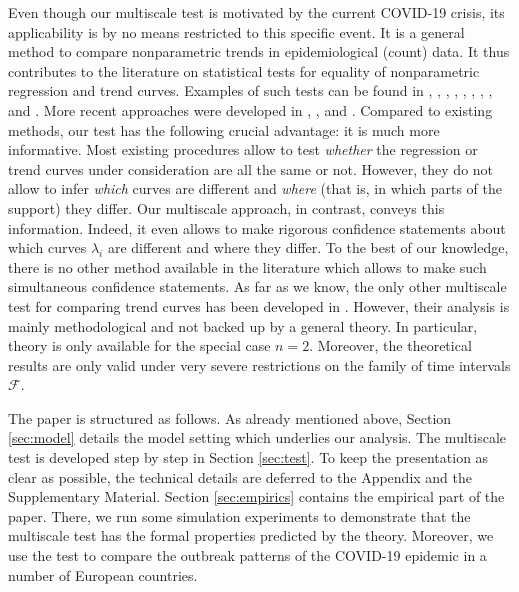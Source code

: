 \documentclass[a4paper,12pt]{article}
\numberwithin{equation}{section}
\begin{document}
Even though our multiscale test is motivated by the current COVID-19 crisis, its applicability is by no means restricted to this specific event. It is a general method to compare nonparametric trends in epidemiological (count) data. It thus contributes to the literature on statistical tests for equality of nonparametric regression and trend curves. Examples of such tests can be found in \cite{HaerdleMarron1990}, \cite{Hall1990}, \cite{King1991}, \cite{Delgado1993}, \cite{Kulasekera1995}, \cite{YoungBowman1995}, \cite{MunkDette1998}, \cite{Lavergne2001}, \cite{NeumeyerDette2003} and \cite{Pardo-Fernandez2007}. More recent approaches were developed in \cite{DegrasWu2012}, \cite{Zhang2012}, \cite{Hidalgo2014} and \cite{ChenWu2018}. Compared to existing methods, our test has the following crucial advantage: it is much more informative. Most existing procedures allow to test \textit{whether} the regression or trend curves under consideration are all the same or not. However, they do not allow to infer \textit{which} curves are different and \textit{where} (that is, in which parts of the support) they differ. Our multiscale approach, in contrast, conveys this information. Indeed, it even allows to make rigorous confidence statements about which curves $\lambda_i$ are different and where they differ. To the best of our knowledge, there is no other method available in the literature which allows to make such simultaneous confidence statements. As far as we know, the only other multiscale test for comparing trend curves has been developed in \cite{Park2009}. However, their analysis is mainly methodological and not backed up by a general theory. In particular, theory is only available for the special case $n = 2$. Moreover, the theoretical results are only valid under very severe restrictions on the family of time intervals $\mathcal{F}$. 

The paper is structured as follows. As already mentioned above, Section \ref{sec:model} details the model setting which underlies our analysis. The multiscale test is developed step by step in Section \ref{sec:test}. To keep the presentation as clear as possible, the technical details are deferred to the Appendix and the Supplementary Material. Section \ref{sec:empirics} contains the empirical part of the paper. There, we run some simulation experiments to demonstrate that the multiscale test has the formal properties predicted by the theory. Moreover, we use the test to compare the outbreak patterns of the COVID-19 epidemic in a number of European countries. 
\end{document}
